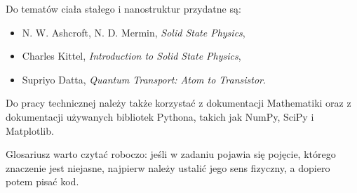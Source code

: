 Do tematów ciała stałego i nanostruktur przydatne są:
\begin{itemize}
    \item N. W. Ashcroft, N. D. Mermin, \emph{Solid State Physics},
    \item Charles Kittel, \emph{Introduction to Solid State Physics},
    \item Supriyo Datta, \emph{Quantum Transport: Atom to Transistor}.
\end{itemize}

Do pracy technicznej należy także korzystać z dokumentacji Mathematiki oraz z dokumentacji używanych bibliotek Pythona, takich jak NumPy, SciPy i Matplotlib.

\begin{summarybox}
Glosariusz warto czytać roboczo: jeśli w zadaniu pojawia się pojęcie, którego znaczenie jest niejasne, najpierw należy ustalić jego sens fizyczny, a dopiero potem pisać kod.
\end{summarybox}
